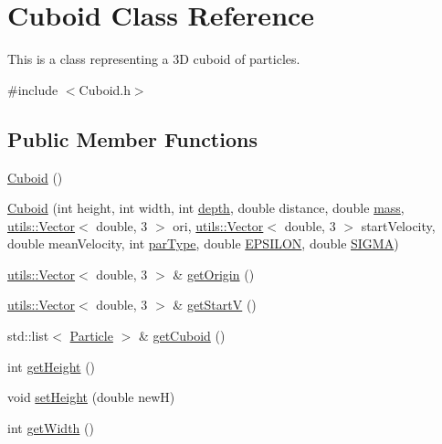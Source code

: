\hypertarget{classCuboid}{\section{Cuboid Class Reference}
\label{classCuboid}
}


This is a class representing a 3\-D cuboid of particles.  




{\ttfamily \#include $<$Cuboid.\-h$>$}

\subsection*{Public Member Functions}
\begin{DoxyCompactItemize}
\item 
\hyperlink{classCuboid_a1abf60e93d024b7a01ee5b1a48f1f08a}{Cuboid} ()
\item 
\hyperlink{classCuboid_a0ae721afc53bc9c3cb0656a51ce78e8c}{Cuboid} (int height, int width, int \hyperlink{MolSim_8cpp_acb5ba97551079e0b072c62c21d784ac5}{depth}, double distance, double \hyperlink{MolSim_8cpp_aba71f400e3a017e824e2a70435a75542}{mass}, \hyperlink{classutils_1_1Vector}{utils\-::\-Vector}$<$ double, 3 $>$ ori, \hyperlink{classutils_1_1Vector}{utils\-::\-Vector}$<$ double, 3 $>$ start\-Velocity, double mean\-Velocity, int \hyperlink{classCuboid_acd3e5d96f6da99b24468ee9673f9daba}{par\-Type}, double \hyperlink{classCuboid_a3925eb122d69d5938939945a961dc96f}{E\-P\-S\-I\-L\-O\-N}, double \hyperlink{classCuboid_a88c7ddda07e9eb992c8b549ca1f6e827}{S\-I\-G\-M\-A})
\item 
\hyperlink{classutils_1_1Vector}{utils\-::\-Vector}$<$ double, 3 $>$ \& \hyperlink{classCuboid_af02d6e6f4f887e73eab49b2e98d67f9f}{get\-Origin} ()
\item 
\hyperlink{classutils_1_1Vector}{utils\-::\-Vector}$<$ double, 3 $>$ \& \hyperlink{classCuboid_afa1a2f414ad4203d0496779e04cd8cc0}{get\-Start\-V} ()
\item 
std\-::list$<$ \hyperlink{classParticle}{Particle} $>$ \& \hyperlink{classCuboid_ace34581c34e11d770268c653734ebbbf}{get\-Cuboid} ()
\item 
int \hyperlink{classCuboid_a9e2f0ed2b9f4e94623d36f0080c39c60}{get\-Height} ()
\item 
void \hyperlink{classCuboid_a7f18edc87842eb994ba5c4553cf1dfd5}{set\-Height} (double new\-H)
\item 
int \hyperlink{classCuboid_ac339d2ee336e723374b4ac60a008f5a4}{get\-Width} ()
\item 

\end{DoxyCompactItemize}
